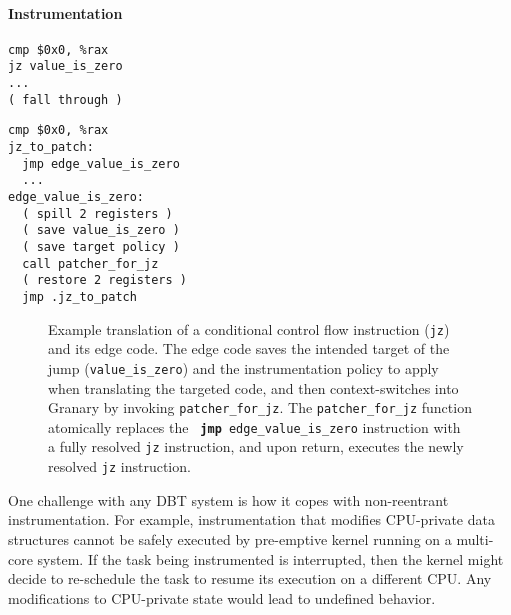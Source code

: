 \documentclass[preprint]{sigplanconf}
\begin{document}
\paragraph{Instrumentation}

\lstset{language=[x64]Assembler}
\newsavebox\nativejcc
\begin{lrbox}{\nativejcc}
\begin{minipage}[b]{4cm}
\begin{lstlisting}[basicstyle=\footnotesize\ttfamily]
cmp $0x0, %rax
jz value_is_zero 
...
( fall through )
\end{lstlisting}
\end{minipage}
\end{lrbox}

\newsavebox\translatedjcc
\begin{lrbox}{\translatedjcc}
\begin{minipage}[b]{4cm}
\begin{lstlisting}[basicstyle=\footnotesize\ttfamily]
  cmp $0x0, %rax
jz_to_patch:
  jmp edge_value_is_zero
  ...
edge_value_is_zero:
  ( spill 2 registers )
  ( save value_is_zero )
  ( save target policy )
  call patcher_for_jz
  ( restore 2 registers )
  jmp .jz_to_patch
\end{lstlisting}
\end{minipage}
\end{lrbox}

\begin{figure}[t!]
\hfill
\caption{\label{fig:direct_edge_code}Example translation of a conditional control flow instruction (\texttt{jz}) and its edge code. The edge code saves the intended target of the jump (\texttt{value\_is\_zero}) and the instrumentation policy to apply when translating the targeted code, and then context-switches into Granary by invoking \texttt{patcher\_for\_jz}. The \texttt{patcher\_for\_jz} function atomically replaces the {\bf\texttt{ jmp}}\texttt{ edge\_value\_is\_zero} instruction with a fully resolved \texttt{jz} instruction, and upon return, executes the newly resolved \texttt{jz} instruction.}
\end{figure}

One challenge with any DBT system is how it copes with non-reentrant instrumentation. For example, instrumentation that modifies CPU-private data structures cannot be safely executed by pre-emptive kernel running on a multi-core system. If the task being instrumented is interrupted, then the kernel might decide to re-schedule the task to resume its execution on a different CPU. Any modifications to CPU-private state would lead to undefined behavior.
\end{document}
